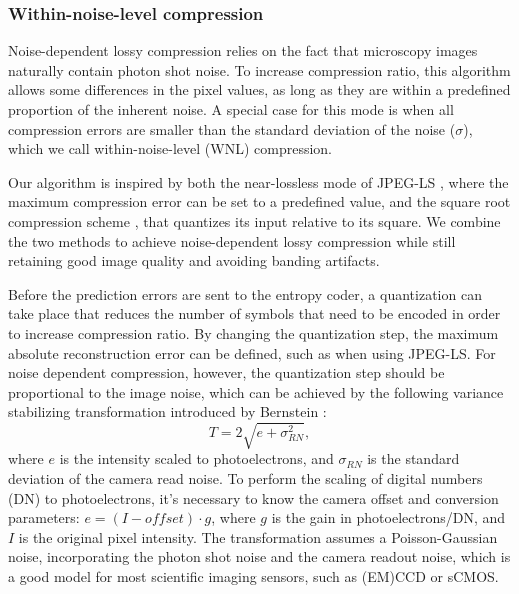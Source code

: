     \subsubsection{Within-noise-level compression}
    \label{sec:wnl}
    Noise-dependent lossy compression relies on the fact that microscopy images naturally contain photon shot noise. To increase compression ratio, this algorithm allows some differences in the pixel values, as long as they are within a predefined proportion of the inherent noise. A special case for this mode is when all compression errors are smaller than the standard deviation of the noise ($\sigma$), which we call within-noise-level (WNL) compression.

    Our algorithm is inspired by both the near-lossless mode of JPEG-LS \cite{weinberger_loco-i_2000}, where the maximum compression error can be set to a predefined value, and the square root compression scheme \cite{gowen_square_2003, bernstein_noise_2010}, that quantizes its input relative to its square. We combine the two methods to achieve noise-dependent lossy compression while still retaining good image quality and avoiding banding artifacts.

    Before the prediction errors are sent to the entropy coder, a quantization can take place that reduces the number of symbols that need to be encoded in order to increase compression ratio. By changing the quantization step, the maximum absolute reconstruction error can be defined, such as when using JPEG-LS. For noise dependent compression, however, the quantization step should be proportional to the image noise, which can be achieved by the following variance stabilizing transformation introduced by Bernstein \etal \cite{bernstein_noise_2010}:
    \begin{equation}
      T = 2 \sqrt{e + \sigma^2_{RN}},
      \label{eq:wnl}
    \end{equation}    
    where $e$ is the intensity scaled to photoelectrons, and $\sigma_{RN}$ is the standard deviation of the camera read noise. To perform the scaling of digital numbers (DN) to photoelectrons, it’s necessary to know the camera offset and conversion parameters: $e=(I-offset)\cdot g$, where $g$ is the gain in photoelectrons/DN, and $I$ is the original pixel intensity. The transformation assumes a Poisson-Gaussian noise, incorporating the photon shot noise and the camera readout noise, which is a good model for most scientific imaging sensors, such as (EM)CCD or sCMOS.

